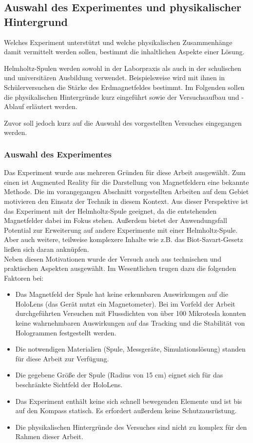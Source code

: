 \subsection{Auswahl des Experimentes und physikalischer Hintergrund}
\label{sec-2-3}
Welches Experiment unterstützt und welche physikalischen Zusammenhänge damit vermittelt werden sollen, bestimmt die inhaltlichen Aspekte einer Lösung. 

Helmholtz-Spulen werden sowohl in der Laborpraxis als auch in der schulischen und universitären Ausbildung verwendet. Beispielsweise wird mit ihnen in Schülerversuchen die Stärke des Erdmagnetfeldes bestimmt. Im Folgenden sollen die physikalischen Hintergründe kurz eingeführt sowie der Versuchsaufbau und -Ablauf erläutert werden.

Zuvor soll jedoch kurz auf die Auswahl des vorgestellten Versuches eingegangen werden.

\subsubsection{Auswahl des Experimentes}
\label{sec-2-3-1}
Das Experiment wurde aus mehreren Gründen für diese Arbeit ausgewählt. Zum einen ist Augmented Reality für die Darstellung von Magnetfeldern eine bekannte Methode. Die im vorangegangen Abschnitt vorgestellten Arbeiten auf dem Gebiet motivieren den Einsatz der Technik in diesem Kontext. Aus dieser Perspektive ist das Experiment mit der Helmholtz-Spule geeignet, da die entstehenden Magnetfelder dabei im Fokus stehen. Außerdem bietet der Anwendungsfall Potential zur Erweiterung auf andere Experimente mit einer Helmholtz-Spule. Aber auch weitere, teilweise komplexere Inhalte wie z.B. das Biot-Savart-Gesetz ließen sich daran anknüpfen.\\

Neben diesen Motivationen wurde der Versuch auch aus technischen und praktischen Aspekten ausgewählt. Im Wesentlichen trugen dazu die folgenden Faktoren bei:
\begin{itemize}
	\singlespacing
	\item Das Magnetfeld der Spule hat keine erkennbaren Auswirkungen auf die HoloLens (das Gerät nutzt ein Magnetometer). Bei im Vorfeld der Arbeit durchgeführten Versuchen mit Flussdichten von über 100 Mikrotesla konnten keine wahrnehmbaren Auswirkungen auf das Tracking und die Stabilität von Hologrammen festgestellt werden.
	\item Die notwendigen Materialien (Spule, Messgeräte, Simulationslösung) standen für diese Arbeit zur Verfügung.
	\item Die gegebene Größe der Spule (Radius von 15 cm) eignet sich für das beschränkte Sichtfeld der HoloLens.
	\item Das Experiment enthält keine sich schnell bewegenden Elemente und ist bis auf den Kompass statisch. Es erfordert außerdem keine Schutzausrüstung.
	\item Die physikalischen Hintergründe des Versuches sind nicht zu komplex für den Rahmen dieser Arbeit.
\end{itemize}

